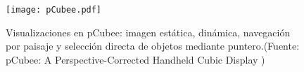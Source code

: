 \begin{figure}[!h]
\begin{center}
\texttt{[image: pCubee.pdf]}
\caption{Visualizaciones en pCubee: imagen estática, dinámica, navegación por paisaje y selección directa de objetos mediante puntero.(Fuente: pCubee: A Perspective-Corrected Handheld Cubic Display \cite{pCubee})}
\label{fig:pCubee}
\end{center}
\end{figure}







